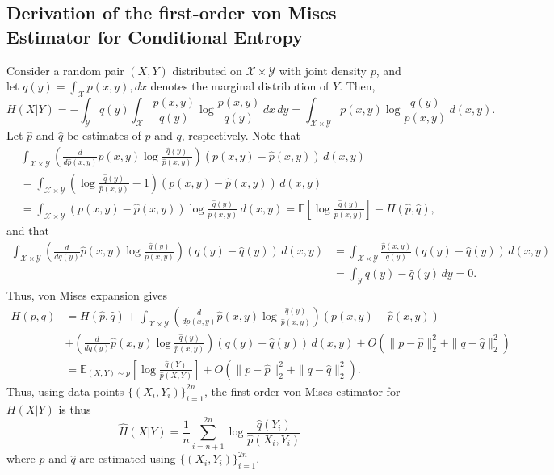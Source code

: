 \documentclass{article} %
\newcommand{\X}{\mathcal{X}}                        %
\newcommand{\Y}{\mathcal{Y}}                        %
\newcommand{\E}{\mathbb{E}}                         %
\begin{document}
\subsection{Derivation of the first-order von Mises Estimator for Conditional
Entropy}
Consider a random pair $(X,Y)$ distributed on $\X \times \Y$ with joint density
$p$, and let $q(y) = \int_\X p(x,y), dx$ denotes the marginal distribution of
$Y$. Then,
\[H(X | Y)
    = -\int_\Y q(y) \int_\X \frac{p(x,y)}{q(y)} \log\frac{p(x,y)}{q(y)}\,dx\,dy
    = \int_{\X \times \Y} p(x,y) \log \frac{q(y)}{p(x,y)} \, d(x,y).\]
Let $\hat p$ and $\hat q$ be estimates of $p$ and $q$, respectively. Note that
\begin{align*}
 & \int_{\X \times \Y} \left( \frac{d}{d\hat p(x,y)} p(x,y)
                                    \log \frac{\hat q(y)}{\hat p(x,y)} \right)
                                            (p(x,y) - \hat p(x,y))\, d(x,y) \\
 &  = \int_{\X \times \Y} \left( \log \frac{\hat q(y)}{\hat p(x,y)} - 1 \right)
    \left( p(x,y) - \hat p(x,y) \right) \, d(x,y) \\
 &  = \int_{\X \times \Y} \left( p(x,y) - \hat p(x,y) \right)
                            \log \frac{\hat q(y)}{\hat p(x,y)} \, d(x,y)
    = \E\left[ \log \frac{\hat q(y)}{\hat p(x,y)} \right] - H(\hat p, \hat q),
\end{align*}
and that
\begin{align*}
\int_{\X \times \Y} \left( \frac{d}{dq(y)} \hat p(x,y)
                                    \log \frac{\hat q(y)}{\hat p(x,y)} \right)
                                            (q(y) - \hat q(y)) \, d(x,y)
 &  = \int_{\X \times \Y} \frac{\hat p(x,y)}{\hat q(y)}
                                            (q(y) - \hat q(y)) \, d(x,y)    \\
 &  = \int_\Y q(y) - \hat q(y) \, dy
    = 0.
\end{align*}
Thus, von Mises expansion gives
\begin{align*}
H(p,q)
 &  = H(\hat p, \hat q)
    + \int_{\X \times \Y} \left( \frac{d}{dp(x,y)} \hat p(x,y)
        \log \frac{\hat q(y)}{\hat p(x,y)} \right) (p(x,y) - \hat p(x,y)) \\
 &  + \left( \frac{d}{dq(y)} \hat p(x,y)
            \log \frac{\hat q(y)}{\hat p(x,y)} \right) (q(y) - \hat q(y)) \, d(x,y)
    + O(\|p - \hat p\|_2^2 + \|q - \hat q\|_2^2)    \\
 &  = \E_{(X,Y) \sim p} \left[ \log \frac{\hat q(Y)}{\hat p(X,Y)} \right]
    + O(\|p - \hat p\|_2^2 + \|q - \hat q\|_2^2).
\end{align*}
Thus, using data points $\{(X_i,Y_i)\}_{i = 1}^{2n}$, the first-order von Mises
estimator for $H(X | Y)$ is thus
\[\hat H(X | Y)
    = \frac{1}{n} \sum_{i = n + 1}^{2n}
                                \log \frac{\hat q(Y_i)}{\hat p(X_i,Y_i)}\]
where $\hat p$ and $\hat q$ are estimated using $\{(X_i,Y_i)\}_{i = 1}^{2n}$.
\end{document}

